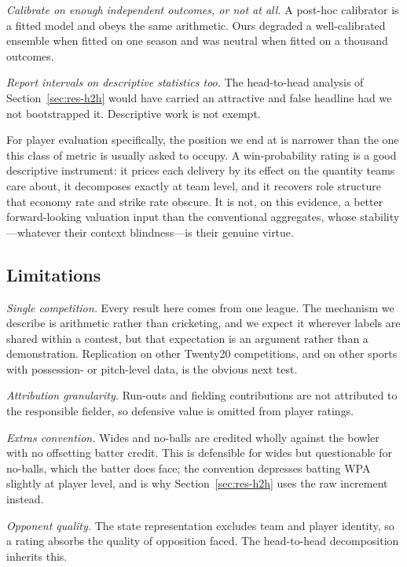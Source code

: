 \documentclass[conference]{IEEEtran}
\begin{document}
\emph{Calibrate on enough independent outcomes, or not at all.} A
post-hoc calibrator is a fitted model and obeys the same arithmetic.
Ours degraded a well-calibrated ensemble when fitted on one season and
was neutral when fitted on a thousand outcomes.

\emph{Report intervals on descriptive statistics too.} The head-to-head
analysis of Section~\ref{sec:res-h2h} would have carried an attractive
and false headline had we not bootstrapped it. Descriptive work is not
exempt.

For player evaluation specifically, the position we end at is narrower
than the one this class of metric is usually asked to occupy. A
win-probability rating is a good descriptive instrument: it prices each
delivery by its effect on the quantity teams care about, it decomposes
exactly at team level, and it recovers role structure that economy rate
and strike rate obscure. It is not, on this evidence, a better
forward-looking valuation input than the conventional aggregates, whose
stability---whatever their context blindness---is their genuine virtue.

\subsection{Limitations}
\label{sec:limits}

\emph{Single competition.} Every result here comes from one league. The
mechanism we describe is arithmetic rather than cricketing, and we
expect it wherever labels are shared within a contest, but that
expectation is an argument rather than a demonstration. Replication on
other Twenty20 competitions, and on other sports with possession- or
pitch-level data, is the obvious next test.

\emph{Attribution granularity.} Run-outs and fielding contributions are
not attributed to the responsible fielder, so defensive value is omitted
from player ratings.

\emph{Extras convention.} Wides and no-balls are credited wholly against
the bowler with no offsetting batter credit. This is defensible for
wides but questionable for no-balls, which the batter does face; the
convention depresses batting WPA slightly at player level, and is why
Section~\ref{sec:res-h2h} uses the raw increment instead.

\emph{Opponent quality.} The state representation excludes team and
player identity, so a rating absorbs the quality of opposition faced.
The head-to-head decomposition inherits this.
\end{document}

